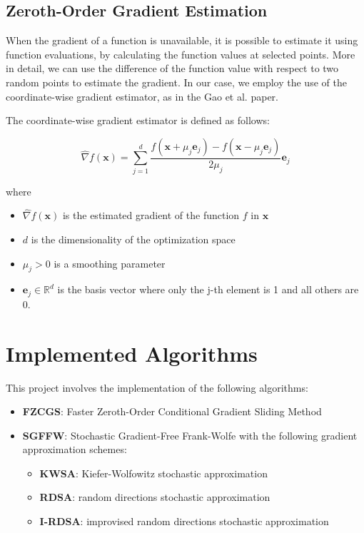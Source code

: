 \documentclass[10pt,twocolumn,letterpaper]{article}
\begin{document}
\subsection{Zeroth-Order Gradient Estimation}

When the gradient of a function is unavailable, it is possible to estimate it using function evaluations,
by calculating the function values at selected points. More in detail, we can use the difference of the
function value with respect to two random points to estimate the gradient. In our case, we employ the use of
the coordinate-wise gradient estimator, as in the Gao et al.\cite{Gao} paper.

The coordinate-wise gradient estimator is defined as follows:

\[
\hat{\nabla} f(\mathbf{x})=\sum_{j=1}^{d} \frac{f\left(\mathbf{x}+\mu_{j} \mathbf{e}_{j}\right)-f\left(\mathbf{x}-\mu_{j} \mathbf{e}_{j}\right)}{2 \mu_{j}} \mathbf{e}_{j}
\]

where

\begin{itemize}



\item $\hat{\nabla} f(\mathbf{x})$ is the estimated gradient of the function $f$ in $\mathbf{x}$

\item $d$ is the dimensionality of the optimization space

\item $\mu_{j}>0$ is a smoothing parameter

\item $\mathbf{e}_{j} \in \mathbb{R}^{d}$ is the basis vector where only the j-th element is 1 and all others are 0.

\end{itemize}

\section{Implemented Algorithms}

This project involves the implementation of the following algorithms:

\begin{itemize}
   \item \textbf{FZCGS}: Faster Zeroth-Order Conditional Gradient Sliding Method \cite{Gao}
   \item \textbf{SGFFW}: Stochastic Gradient-Free Frank-Wolfe \cite{Sahu} with the following gradient approximation schemes:
      \begin{itemize}
         \item \textbf{KWSA}: Kiefer-Wolfowitz stochastic approximation
         \item \textbf{RDSA}: random directions stochastic approximation
         \item \textbf{I-RDSA}: improvised random directions stochastic approximation
      \end{itemize}
\end{itemize}
\end{document}
